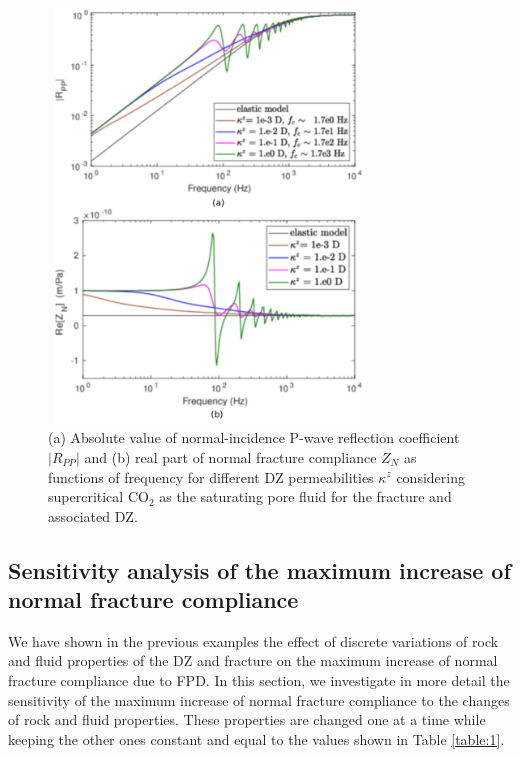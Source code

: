 \documentclass[draft]{agujournal2019}
\begin{document}
\begin{figure}[hp]
\centering
        \includegraphics[width=85mm, height=110mm]{Figure9.pdf}
\caption {(a) Absolute value of normal-incidence P-wave reflection coefficient $|R_{PP}|$ and (b) real part of normal fracture compliance $Z_N$ as functions of frequency for different DZ permeabilities $\kappa^z$ considering supercritical CO$_2$ as the saturating pore fluid for the fracture and associated DZ.}
\label{fig:9}
\end{figure}

\subsection {Sensitivity analysis of the maximum increase of normal fracture compliance}

We have shown in the previous examples the effect of discrete variations of rock and fluid properties of the DZ and fracture on the maximum increase of normal fracture compliance due to FPD. In this section, we investigate in more detail the sensitivity of the maximum increase of normal fracture compliance to the  changes of rock and fluid properties. These properties are changed one at a time while keeping the other ones constant and equal to the values shown in Table \ref{table:1}.
\end{document}
